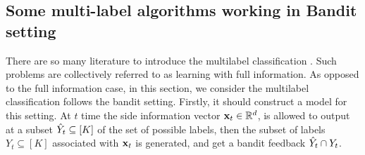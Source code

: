 \subsection{Some multi-label algorithms working in Bandit setting}
\label{subsec:multilabelBF}
There are so many literature to introduce the multilabel classification \cite{madjarov2012extensive,gao2013consistency,kong2011ensemble,sorower2010literature}. Such problems are collectively referred to as learning with full information. As opposed to the full information case, in this section, we consider the multilabel classification follows the bandit setting. Firstly, it should construct a model for this setting. At $t$ time the side information vector $\mathbf{x}_t\in \mathbb{R}^d$, is allowed to output at a subset $\hat{Y}_t\subseteq [K]$ of the set of possible labels, then the subset of labels $Y_t\subseteq [K]$ associated with $\mathbf{x}_t$ is generated, and get a bandit feedback $\hat{Y}_t \cap Y_t$. 

